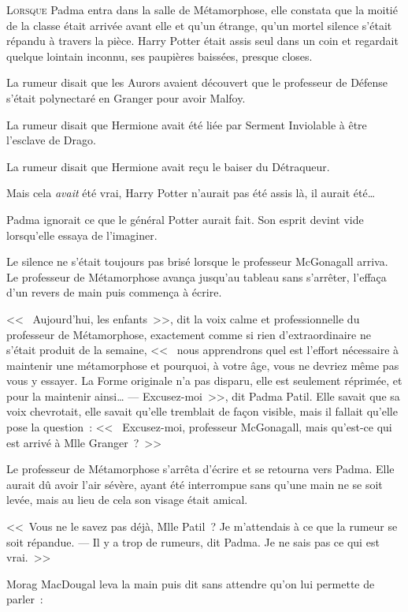 
\lettrine{L}{orsque}  Padma entra dans la salle de Métamorphose, elle constata que la moitié de la classe était arrivée avant elle et qu'un étrange, qu'un mortel silence s'était répandu à travers la pièce. Harry Potter était assis seul dans un coin et regardait quelque lointain inconnu, ses paupières baissées, presque closes.

La rumeur disait que les Aurors avaient découvert que le professeur de Défense s'était polynectaré en Granger pour avoir Malfoy.

La rumeur disait que Hermione avait été liée par Serment Inviolable à être l'esclave de Drago.

La rumeur disait que Hermione avait reçu le baiser du Détraqueur.

Mais cela \emph{avait} été vrai, Harry Potter n'aurait pas été assis là, il aurait été…

Padma ignorait ce que le général Potter aurait fait. Son esprit devint vide lorsqu'elle essaya de l'imaginer.

Le silence ne s'était toujours pas brisé lorsque le professeur McGonagall arriva. Le professeur de Métamorphose avança jusqu'au tableau sans s'arrêter, l'effaça d'un revers de main puis commença à écrire.

<<~ Aujourd'hui, les enfants~>>, dit la voix calme et professionnelle du professeur de Métamorphose, exactement comme si rien d'extraordinaire ne s'était produit de la semaine, <<~ nous apprendrons quel est l'effort nécessaire à maintenir une métamorphose et pourquoi, à votre âge, vous ne devriez même pas vous y essayer. La Forme originale n'a pas disparu, elle est seulement réprimée, et pour la maintenir ainsi…
---  Excusez-moi~>>, dit Padma Patil. Elle savait que sa voix chevrotait, elle savait qu'elle tremblait de façon visible, mais il fallait qu'elle pose la question~: <<~ Excusez-moi, professeur McGonagall, mais qu'est-ce qui est arrivé à Mlle Granger~?~>>

Le professeur de Métamorphose s'arrêta d'écrire et se retourna vers Padma. Elle aurait dû avoir l'air sévère, ayant été interrompue sans qu'une main ne se soit levée, mais au lieu de cela son visage était amical.

<<~Vous ne le savez pas déjà, Mlle Patil~? Je m'attendais à ce que la rumeur se soit répandue.
---  Il y a trop de rumeurs, dit Padma. Je ne sais pas ce qui est vrai.~>>

Morag MacDougal leva la main puis dit sans attendre qu'on lui permette de parler~:

